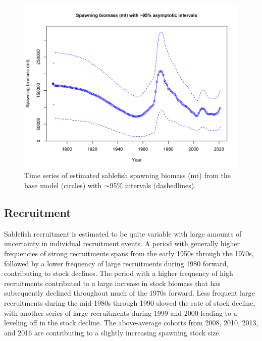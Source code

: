 \documentclass[11pt,
  english,
  a4paper,
]{article}
\begin{document}

\begin{figure}
\centering
\includegraphics[width=1\textwidth,height=1\textheight]{figs/ts7_Spawning_biomass_mt_with_95_asymptotic_intervals_intervals.png}
\caption{Time series of estimated sablefish spawning biomass (mt) from the base model (circles) with ∼95\% intervals (dashedlines).}
\end{figure}

\tagmcend\tagstructend

\quad


\hypertarget{recruitment}{%
\subsection*{Recruitment}\label{recruitment}}

\leavevmode\tagmcend\tagstructend


Sablefish recruitment is estimated to be quite variable with large amounts of uncertainty in individual recruitment events. A period with generally higher frequencies of strong recruitments spans from the early 1950s through the 1970s, followed by a lower frequency of large recruitments during 1980 forward, contributing to stock declines. The period with a higher frequency of high recruitments contributed to a large increase in stock biomass that has subsequently declined throughout much of the 1970s forward. Less frequent large recruitments during the mid-1980s through 1990 slowed the rate of stock decline, with another series of large recruitments during 1999 and 2000 leading to a leveling off in the stock decline. The above-average cohorts from 2008, 2010, 2013, and 2016 are contributing to a slightly increasing spawning stock size.
\end{document}
